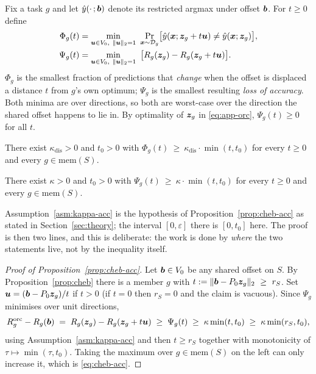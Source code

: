 \begin{definition}
\label{def:profiles}
Fix a task $g$ and let $\hat y(\cdot\,;\bm{b})$ denote its restricted argmax under
offset $\bm{b}$. For $t\ge0$ define
\begin{align}
  \Phi_g(t) &= \min_{\bm{u}\in V_0,\ \|\bm{u}\|_2=1}
    \ \Pr_{\bm{x}\sim\mathcal{D}_g}\!\big[\hat y(\bm{x};\bm{z}_g+t\bm{u})\neq \hat y(\bm{x};\bm{z}_g)\big],
    \label{eq:app-phi}\\
  \Psi_g(t) &= \min_{\bm{u}\in V_0,\ \|\bm{u}\|_2=1}
    \ \big[R_g(\bm{z}_g)-R_g(\bm{z}_g+t\bm{u})\big].
    \label{eq:app-psi}
\end{align}
$\Phi_g$ is the smallest fraction of predictions that \emph{change} when the offset
is displaced a distance $t$ from $g$'s own optimum; $\Psi_g$ is the smallest
resulting \emph{loss of accuracy}. Both minima are over directions, so both are
worst-case over the direction the shared offset happens to lie in. By optimality
of $\bm{z}_g$ in \eqref{eq:app-orc}, $\Psi_g(t)\ge0$ for all $t$.
\end{definition}

\begin{assumption}
\label{asm:kappa-dis}
There exist $\kappa_{\mathrm{dis}}>0$ and $t_0>0$ with
$\Phi_g(t)\ \ge\ \kappa_{\mathrm{dis}}\cdot\min(t,t_0)$ for every $t\ge0$ and every
$g\in\mathrm{mem}(S)$.
\end{assumption}

\begin{assumption}
\label{asm:kappa-acc}
There exist $\kappa>0$ and $t_0>0$ with
$\Psi_g(t)\ \ge\ \kappa\cdot\min(t,t_0)$ for every $t\ge0$ and every
$g\in\mathrm{mem}(S)$.
\end{assumption}

Assumption~\ref{asm:kappa-acc} is the hypothesis of
Proposition~\ref{prop:cheb-acc} as stated in Section~\ref{sec:theory}; the
interval $[0,\varepsilon]$ there is $[0,t_0]$ here. The proof is then two lines,
and this is deliberate: the work is done by \emph{where} the two statements live,
not by the inequality itself.

\begin{proof}[Proof of Proposition~\ref{prop:cheb-acc}]
Let $\bm{b}\in V_0$ be any shared offset on $S$. By Proposition~\ref{prop:cheb} there
is a member $g$ with $t:=\|\bm{b}-P_0\bm{z}_g\|_2\ \ge\ r_S$. Set
$\bm{u}=(\bm{b}-P_0\bm{z}_g)/t$ if $t>0$ (if $t=0$ then $r_S=0$ and the claim is
vacuous). Since $\Psi_g$ minimises over unit directions,
\begin{equation}
  R_g^{\mathrm{orc}}-R_g(\bm{b})
  \;=\; R_g(\bm{z}_g)-R_g(\bm{z}_g+t\bm{u})
  \;\ge\; \Psi_g(t)
  \;\ge\; \kappa\min(t,t_0)
  \;\ge\; \kappa\min(r_S,t_0),
  \label{eq:app-cheb-acc-chain}
\end{equation}
using Assumption~\ref{asm:kappa-acc} and then $t\ge r_S$ together with
monotonicity of $\tau\mapsto\min(\tau,t_0)$. Taking the maximum over
$g\in\mathrm{mem}(S)$ on the left can only increase it, which is
\eqref{eq:cheb-acc}.
\end{proof}


